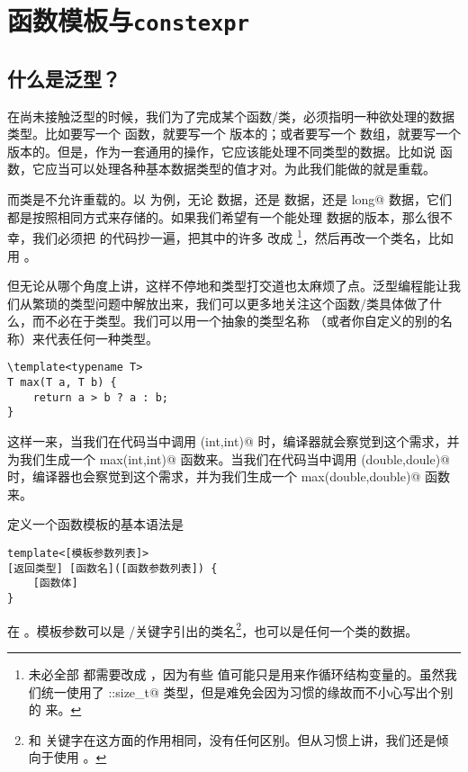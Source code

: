 \section{函数模板与\texttt{constexpr}}
\subsection*{什么是泛型？}
在尚未接触泛型的时候，我们为了完成某个函数/类，必须指明一种欲处理的数据类型。比如要写一个 \lstinline@max@ 函数，就要写一个 \lstinline@double@ 版本的；或者要写一个 \lstinline@valarray@ 数组，就要写一个 \lstinline@int@ 版本的。但是，作为一套通用的操作，它应该能处理不同类型的数据。比如说 \lstinline@max@ 函数，它应当可以处理各种基本数据类型的值才对。为此我们能做的就是重载。\par
而类是不允许重载的。以 \lstinline@valarray@ 为例，无论 \lstinline@int@ 数据，还是 \lstinline@double@ 数据，还是 \lstinline@long long@ 数据，它们都是按照相同方式来存储的。如果我们希望有一个能处理 \lstinline@double@ 数据的版本，那么很不幸，我们必须把 \lstinline@valarri@ 的代码抄一遍，把其中的许多 \lstinline@int@ 改成 \lstinline@double@\footnote{未必全部 \lstinline@int@ 都需要改成 \lstinline@double@，因为有些 \lstinline@int@ 值可能只是用来作循环结构变量的。虽然我们统一使用了 \lstinline@std::size_t@ 类型，但是难免会因为习惯的缘故而不小心写出个别的 \lstinline@int@ 来。}，然后再改一个类名，比如用 \lstinline@valarrd@。\par
但无论从哪个角度上讲，这样不停地和类型打交道也太麻烦了点。泛型编程能让我们从繁琐的类型问题中解放出来，我们可以更多地关注这个函数/类具体做了什么，而不必在于类型。我们可以用一个抽象的类型名称 \lstinline@T@（或者你自定义的别的名称）来代表任何一种类型。
\begin{lstlisting}
\template<typename T>
T max(T a, T b) {
    return a > b ? a : b;
}
\end{lstlisting}
这样一来，当我们在代码当中调用 \lstinline@max(int,int)@ 时，编译器就会察觉到这个需求，并为我们生成一个 \lstinline@int max(int,int)@ 函数来。当我们在代码当中调用 \lstinline@max(double,doule)@ 时，编译器也会察觉到这个需求，并为我们生成一个 \lstinline@double max(double,double)@ 函数来。\par
定义一个函数模板的基本语法是
\begin{lstlisting}
template<[模板参数列表]>
[返回类型] [函数名]([函数参数列表]) {
    [函数体]
}
\end{lstlisting}
在 。模板参数可以是 \lstinline@typename@/\lstinline@class@ 关键字引出的类名\footnote{\lstinline@typename@ 和 \lstinline@class@ 关键字在这方面的作用相同，没有任何区别。但从习惯上讲，我们还是倾向于使用 \lstinline@typename@。}，也可以是任何一个类的数据。
